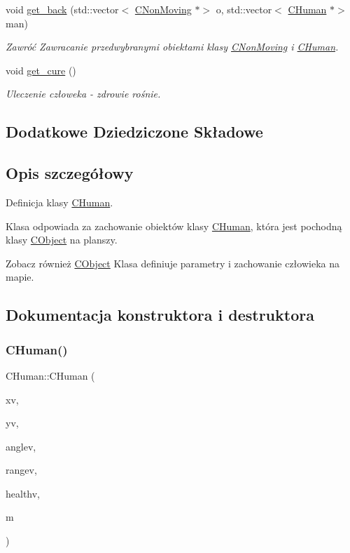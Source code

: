 \begin{DoxyCompactItemize}
void \mbox{\hyperlink{class_c_human_a4d9c1909ca3b170a657143c5f49e0247}{get\+\_\+back}} (std\+::vector$<$ \mbox{\hyperlink{class_c_non_moving}{C\+Non\+Moving}} $\ast$$>$ o, std\+::vector$<$ \mbox{\hyperlink{class_c_human}{C\+Human}} $\ast$$>$ man)
\begin{DoxyCompactList}\small\item\em Zawróć Zawracanie przedwybranymi obiektami klasy \mbox{\hyperlink{class_c_non_moving}{C\+Non\+Moving}} i \mbox{\hyperlink{class_c_human}{C\+Human}}. \end{DoxyCompactList}\item 
void \mbox{\hyperlink{class_c_human_acd694c61a21bdb717206bc7f458c2c36}{get\+\_\+cure}} ()
\begin{DoxyCompactList}\small\item\em Uleczenie człoweka -\/ zdrowie rośnie. \end{DoxyCompactList}\end{DoxyCompactItemize}
\subsection*{Dodatkowe Dziedziczone Składowe}


\subsection{Opis szczegółowy}
Definicja klasy \mbox{\hyperlink{class_c_human}{C\+Human}}. 

Klasa odpowiada za zachowanie obiektów klasy \mbox{\hyperlink{class_c_human}{C\+Human}}, która jest pochodną klasy \mbox{\hyperlink{class_c_object}{C\+Object}} na planszy. \begin{DoxySeeAlso}{Zobacz również}
\mbox{\hyperlink{class_c_object}{C\+Object}} Klasa definiuje parametry i zachowanie człowieka na mapie. 
\end{DoxySeeAlso}


\subsection{Dokumentacja konstruktora i destruktora}
\mbox{\label{class_c_human_ac22428a4cdaa94ce6b238d690caa8406}} 
\subsubsection{\texorpdfstring{C\+Human()}{CHuman()}}
{\footnotesize\ttfamily C\+Human\+::\+C\+Human (\begin{DoxyParamCaption}\item[{qreal}]{xv,  }\item[{qreal}]{yv,  }\item[{qreal}]{anglev,  }\item[{qreal}]{rangev,  }\item[{qreal}]{healthv,  }\item[{\mbox{\hyperlink{class_c_map}{C\+Map}} $\ast$}]{m }\end{DoxyParamCaption})}



